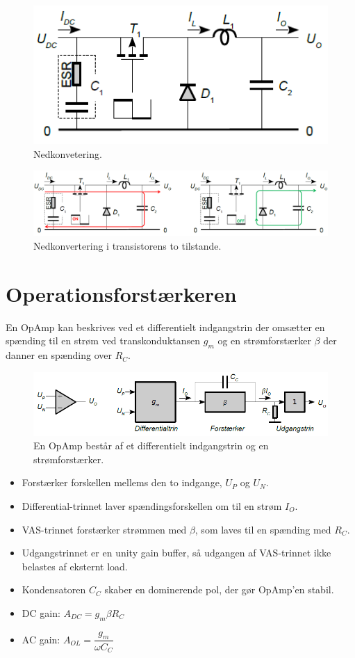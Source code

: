 \documentclass[danish]{article}
\begin{document}
\begin{figure} [H]
	\centering
	\includegraphics[width=0.6\linewidth]{graphics/nedkonvertering}
	\caption{Nedkonvetering.}
	\label{fig:nedkonvertering}
\end{figure}

\begin{figure} [H]
	\centering
	\includegraphics[width=\linewidth]{graphics/dcdc_nedkonvertering}
	\caption{Nedkonvertering i transistorens to tilstande.}
	\label{fig:dcdc_nedkonvertering}
\end{figure}

\newpage 
\section{Operationsforstærkeren}
En OpAmp kan beskrives ved et differentielt indgangstrin der omsætter en spænding til en strøm ved transkonduktansen $g_m$ og en strømforstærker $\beta$ der danner en spænding over $R_C$.

\begin{figure} [H]
	\centering
	\includegraphics[width=\linewidth]{graphics/opamp_trin}
	\caption{En OpAmp består af et differentielt indgangstrin og en strømforstærker.}
	\label{fig:opamptrin}
\end{figure}

\begin{itemize}
	\item Forstærker forskellen mellems den to indgange, $U_P$ og $U_N$.
	\item Differential-trinnet laver spændingsforskellen om til en strøm $I_O$.
	\item VAS-trinnet forstærker strømmen med $\beta$, som laves til en spænding med $R_C$.
	\item Udgangstrinnet er en unity gain buffer, så udgangen af VAS-trinnet ikke belastes af eksternt load.
	\item Kondensatoren $C_C$ skaber en dominerende pol, der gør OpAmp’en stabil.
	\item DC gain: $A_{DC} = g_m \beta R_C$
	\item AC gain: $A_{OL} = \dfrac{g_m}{\omega C_C}$
\end{itemize}
\end{document}
